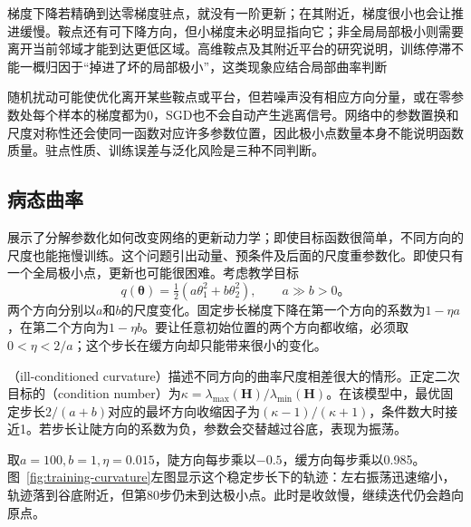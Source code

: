 梯度下降若精确到达零梯度驻点，就没有一阶更新；在其附近，梯度很小也会让推进缓慢。鞍点还有可下降方向，但小梯度未必明显指向它；非全局局部极小则需要离开当前邻域才能到达更低区域。高维鞍点及其附近平台的研究说明，训练停滞不能一概归因于“掉进了坏的局部极小”，这类现象应结合局部曲率判断

随机扰动可能使优化离开某些鞍点或平台，但若噪声没有相应方向分量，或在零参数处每个样本的梯度都为0，SGD也不会自动产生逃离信号。网络中的参数置换和尺度对称性还会使同一函数对应许多参数位置，因此极小点数量本身不能说明函数质量。驻点性质、训练误差与泛化风险是三种不同判断。

\subsection{病态曲率}
\label{sec:training-curvature}

展示了分解参数化如何改变网络的更新动力学；即使目标函数很简单，不同方向的尺度也能拖慢训练。这个问题引出动量、预条件及后面的尺度重参数化。即使只有一个全局极小点，更新也可能很困难。考虑教学目标
\begin{equation}
  q(\bm\theta)=\tfrac12(a\theta_1^2+b\theta_2^2),
  \qquad a\gg b>0\text{。}
  \label{eq:training-quadratic}
\end{equation}
两个方向分别以$a$和$b$的尺度变化。固定步长梯度下降在第一个方向的系数为$1-\eta a$，在第二个方向为$1-\eta b$。要让任意初始位置的两个方向都收缩，必须取$0<\eta<2/a$；这个步长在缓方向却只能带来很小的变化。

（ill-conditioned curvature）描述不同方向的曲率尺度相差很大的情形。正定二次目标的（condition number）为$\kappa=\lambda_{\max}(\bm H)/\lambda_{\min}(\bm H)$。在该模型中，最优固定步长$2/(a+b)$对应的最坏方向收缩因子为$(\kappa-1)/(\kappa+1)$，条件数大时接近1。若步长让陡方向的系数为负，参数会交替越过谷底，表现为振荡。

取$a=100,b=1,\eta=0.015$，陡方向每步乘以$-0.5$，缓方向每步乘以0.985。图~\ref{fig:training-curvature}左图显示这个稳定步长下的轨迹：左右振荡迅速缩小，轨迹落到谷底附近，但第80步仍未到达极小点。此时是收敛慢，继续迭代仍会趋向原点。

